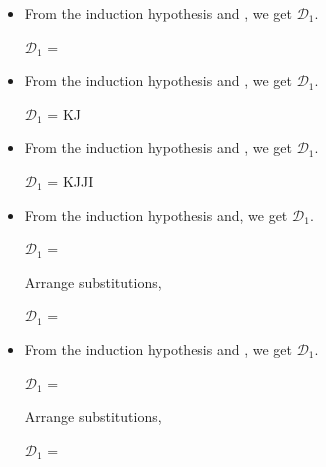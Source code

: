 \begin{itemize}
	\item \QKRefl

	      From the induction hypothesis and \QKRefl, we get $\mathcal{D}_1$.

	      $\mathcal{D}_1$ = 
	      {}

	\item \QKSym

	      From the induction hypothesis and \QKSym, we get $\mathcal{D}_1$.

	      $\mathcal{D}_1$ = 
	      {\GGV K\SB\E J\SB@A\SB}

	\item \QKTrans

	      From the induction hypothesis and \QKTrans, we get $\mathcal{D}_1$.

	      $\mathcal{D}_1$ = 
	      {\GGV K\SB\E J\SB@A\SB \andalso \GGV J\SB\E I\SB@A\SB}

	\item \QTAbs

	      From the induction hypothesis and, we get $\mathcal{D}_1$.

	      $\mathcal{D}_1$ = 
	      { \andalso {}}

	      Arrange substitutions,

	      $\mathcal{D}_1$ = 
	      { \andalso {}}

	\item \QTApp

	      From the induction hypothesis and \QTApp, we get $\mathcal{D}_1$.

	      $\mathcal{D}_1$ = 
	      { \andalso {}}

	      Arrange substitutions,

	      $\mathcal{D}_1$ = 
	      { \andalso {}}


\end{itemize}
